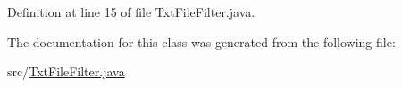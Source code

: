 Definition at line 15 of file Txt\-File\-Filter.\-java.



The documentation for this class was generated from the following file\-:\begin{DoxyCompactItemize}
\item 
src/\hyperlink{_txt_file_filter_8java}{Txt\-File\-Filter.\-java}\end{DoxyCompactItemize}
